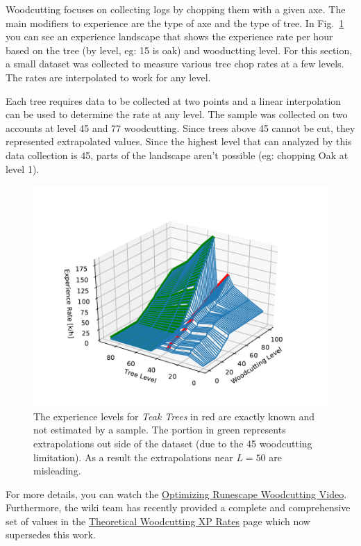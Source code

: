 

Woodcutting focuses on collecting logs by chopping them with a given axe. The main modifiers to experience are the type of axe and the type of tree. In Fig.~\ref{fig:woodcutting_landscape} you can see an experience landscape that shows the experience rate per hour based on the tree (by level, eg: 15 is oak) and wooductting level. For this section, a small dataset was collected to measure various tree chop rates at a few levels. The rates are interpolated to work for any level. 


Each tree requires data to be collected at two points and a linear interpolation can be used to determine the rate at any level. The sample was collected on two accounts at level 45 and 77 woodcutting. Since trees above 45 cannot be cut, they represented extrapolated values. Since the highest level that can analyzed by this data collection is 45, parts of the landscape aren't possible (eg: chopping Oak at level 1).

\begin{figure}
	\centering
	\includegraphics[width=\linewidth]{img/woodcutting/experience.pdf}
	\caption{
		The experience levels for \emph{Teak Trees} in red are exactly known and not estimated by a sample. The portion in green represents extrapolations out side of the dataset (due to the 45 woodcutting limitation). As a result the extrapolations near $L=50$ are misleading. 
	}
	\label{fig:woodcutting_landscape}
\end{figure}


For more details, you can watch the \href{https://www.youtube.com/watch?v=vYPLkFTDe5Y&t=39s&ab_channel=Palfore}{Optimizing Runescape Woodcutting Video}. Furthermore, the wiki team has recently provided a complete and comprehensive set of values in the \href{https://oldschool.runescape.wiki/w/Pay-to-play_Woodcutting_training\#Theoretical_experience_rates}{Theoretical Woodcutting XP Rates} page which now supersedes this work.
